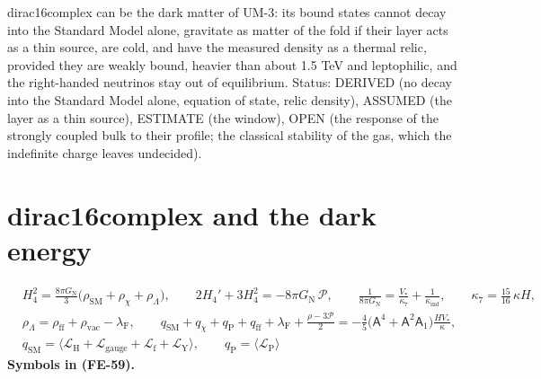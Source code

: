\documentclass[
  10pt,
]{article}
\begin{document}
dirac16complex can be the dark matter of UM-3: its bound states cannot
decay into the Standard Model alone, gravitate as matter of the fold if
their layer acts as a thin source, are cold, and have the measured
density as a thermal relic, provided they are weakly bound, heavier than
about 1.5 TeV and leptophilic, and the right-handed neutrinos stay out
of equilibrium. Status: DERIVED (no decay into the Standard Model alone,
equation of state, relic density), ASSUMED (the layer as a thin source),
ESTIMATE (the window), OPEN (the response of the strongly coupled bulk
to their profile; the classical stability of the gas, which the
indefinite charge leaves undecided).

\hypertarget{dirac16complex-and-the-dark-energy}{%
\section{dirac16complex and the dark
energy}\label{dirac16complex-and-the-dark-energy}}

\[
\begin{aligned}
&H_4^2 = \frac{8\pi G_{\mathrm{N}}}{3}\big(\rho_{\mathrm{SM}} + \rho_\chi + \rho_\Lambda\big),\qquad
 2H_4' + 3H_4^2 = -8\pi G_{\mathrm{N}}\,\mathcal{P},\qquad
 \frac{1}{8\pi G_{\mathrm{N}}} = \frac{V_*}{\kappa_7} + \frac{1}{\kappa_{\mathrm{ind}}},\qquad \kappa_7 = \frac{15}{16}\,\kappa H,\\
&\rho_\Lambda = \rho_{\mathrm{ff}} + \rho_{\mathrm{vac}} - \lambda_{\mathrm{F}},\qquad
 q_{\mathrm{SM}} + q_\chi + q_{\mathrm{P}} + q_{\mathrm{ff}} + \lambda_{\mathrm{F}} + \frac{\rho - 3\mathcal{P}}{2}
 = -\frac45\big(\mathsf{A}^4 + \mathsf{A}^2\mathsf{A}_1\big)\frac{HV_*}{\kappa},\\
&q_{\mathrm{SM}} = \big\langle\mathcal{L}_{\mathrm{H}} + \mathcal{L}_{\mathrm{gauge}} + \mathcal{L}_{\mathrm{f}} + \mathcal{L}_{\mathrm{Y}}\big\rangle,\qquad
 q_{\mathrm{P}} = \langle\mathcal{L}_{\mathrm{P}}\rangle
\end{aligned} \tag{FE-59}
\] \textbf{Symbols in (FE-59).}
\end{document}
